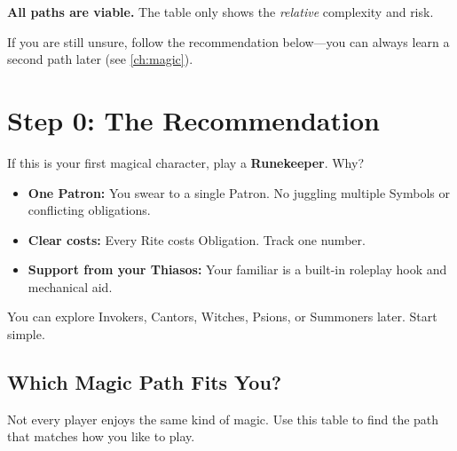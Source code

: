 \noindent
\textbf{All paths are viable.} The table only shows the \textit{relative} complexity and risk.

If you are still unsure, follow the recommendation below---you can always learn a second path later (see \ref{ch:magic}).

\section{Step 0: The Recommendation}

If this is your first magical character, play a \textbf{Runekeeper}. Why?

\begin{itemize}
  \item \textbf{One Patron:} You swear to a single Patron. No juggling multiple Symbols or conflicting obligations.
  \item \textbf{Clear costs:} Every Rite costs Obligation. Track one number.
  \item \textbf{Support from your Thiasos:} Your familiar is a built-in roleplay hook and mechanical aid.
\end{itemize}

You can explore Invokers, Cantors, Witches, Psions, or Summoners later. Start simple.

\subsection*{Which Magic Path Fits You?}

Not every player enjoys the same kind of magic. Use this table to find the path that matches how you like to play.

